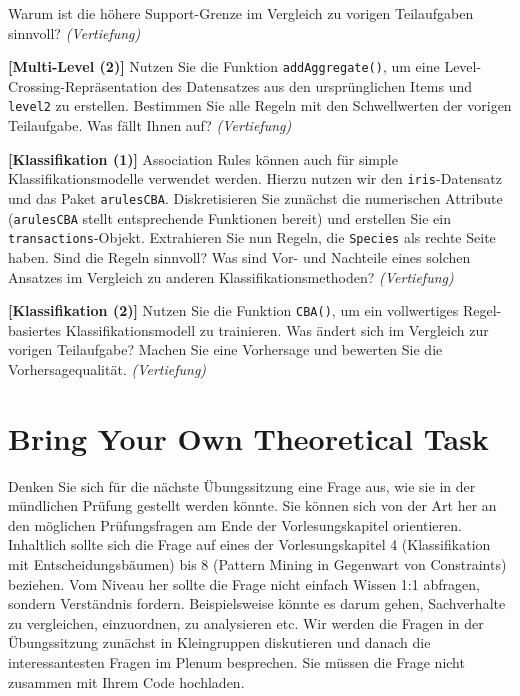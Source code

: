 \documentclass[headinclude,headsepline]{scrartcl}
\newcommand{\taskcategory}[1]{{\color[HTML]{800000}\emph{(#1)}}}
\newcommand{\taskname}[1]{\textbf{[#1]}}
\newcommand{\code}[1]{{\color[HTML]{000080}\texttt{#1}}}
\begin{document}
\begin{compactenum}[a)]
	Warum ist die höhere Support-Grenze im Vergleich zu vorigen Teilaufgaben sinnvoll?
	\taskcategory{Vertiefung}
	\item
	\taskname{Multi-Level (2)}
	Nutzen Sie die Funktion \code{addAggregate()}, um eine Level-Crossing-Repräsentation des Datensatzes aus den ursprünglichen Items und \code{level2} zu erstellen.
	Bestimmen Sie alle Regeln mit den Schwellwerten der vorigen Teilaufgabe.
	Was fällt Ihnen auf?
	\taskcategory{Vertiefung}
	\item
	\taskname{Klassifikation (1)}
	Association Rules können auch für simple Klassifikationsmodelle verwendet werden.
	Hierzu nutzen wir den \code{iris}-Datensatz und das Paket \code{arulesCBA}.
	Diskretisieren Sie zunächst die numerischen Attribute (\code{arulesCBA} stellt entsprechende Funktionen bereit) und erstellen Sie ein \code{transactions}-Objekt.
	Extrahieren Sie nun Regeln, die \code{Species} als rechte Seite haben.
	Sind die Regeln sinnvoll?
	Was sind Vor- und Nachteile eines solchen Ansatzes im Vergleich zu anderen Klassifikationsmethoden?
	\taskcategory{Vertiefung}
	\item
	\taskname{Klassifikation (2)}
	Nutzen Sie die Funktion \code{CBA()}, um ein vollwertiges Regel-basiertes Klassifikationsmodell zu trainieren.
	Was ändert sich im Vergleich zur vorigen Teilaufgabe?
	Machen Sie eine Vorhersage und bewerten Sie die Vorhersagequalität.
	\taskcategory{Vertiefung}
\end{compactenum}

\section{Bring Your Own Theoretical Task}

Denken Sie sich für die nächste Übungssitzung eine Frage aus, wie sie in der mündlichen Prüfung gestellt werden könnte.
Sie können sich von der Art her an den möglichen Prüfungs\-fragen am Ende der Vorlesungskapitel orientieren.
Inhaltlich sollte sich die Frage auf eines der Vorlesungskapitel 4 (Klassifikation mit Entscheidungsbäumen) bis 8 (Pattern Mining in Gegenwart von Constraints) beziehen.
Vom Niveau her sollte die Frage nicht einfach Wissen 1:1 abfragen, sondern Verständnis fordern.
Beispielsweise könnte es darum gehen, Sachverhalte zu vergleichen, einzuordnen, zu analysieren etc.
Wir werden die Fragen in der Übungssitzung zunächst in Kleingruppen diskutieren und danach die interessantesten Fragen im Plenum besprechen.
Sie müssen die Frage nicht zusammen mit Ihrem Code hochladen.
\end{document}
